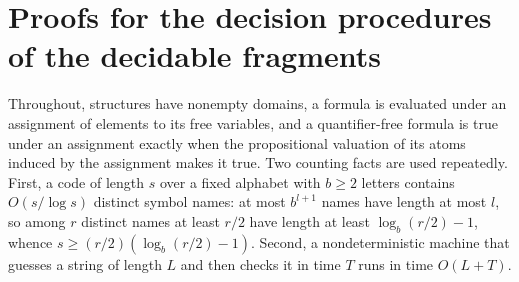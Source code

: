 \section{Proofs for the decision procedures of the decidable fragments}
\label{sec:annex-p02-w02-p02-035-decision-procedures}

Throughout, structures have nonempty domains, a formula is evaluated under an
assignment of elements to its free variables, and a quantifier-free formula is
true under an assignment exactly when the propositional valuation of its
atoms induced by the assignment makes it true.  Two counting facts are used
repeatedly.  First, a code of length \(s\) over a fixed alphabet with \(b\geq2\)
letters contains \(O(s/\log s)\) distinct symbol names: at most \(b^{l+1}\)
names have length at most \(l\), so among \(r\) distinct names at least \(r/2\)
have length at least \(\log_b(r/2)-1\), whence
\(s\geq(r/2)(\log_b(r/2)-1)\).  Second, a nondeterministic machine that guesses
a string of length \(L\) and then checks it in time \(T\) runs in time
\(O(L+T)\).

